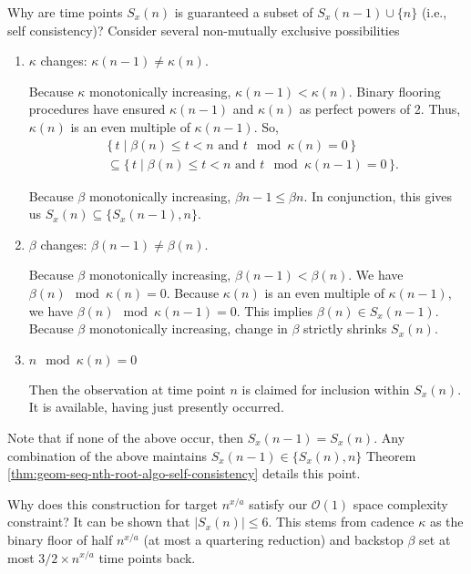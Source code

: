 Why are time points $S_x(n)$ is guaranteed a subset of $S_x(n-1) \cup \{n\}$ (i.e., self consistency)?
Consider several non-mutually exclusive possibilities
\begin{enumerate}
  \item $\kappa$ changes: $\kappa(n - 1) \neq \kappa(n)$.

  Because $\kappa$ monotonically increasing, $\kappa(n - 1) < \kappa(n)$.
  Binary flooring procedures have ensured $\kappa(n - 1)$ and $\kappa(n)$ as perfect powers of 2.
  Thus, $\kappa(n)$ is an even multiple of $\kappa(n - 1)$.
  So,
  \begin{align*}
    &\{\, t \mid \beta(n) \leq t < n \text{ and } t \mod \kappa(n) = 0 \,\}\\
    &\subseteq \{\, t \mid \beta(n) \leq t < n \text{ and } t \mod \kappa(n - 1) = 0 \,\}.
  \end{align*}

  Because $\beta$ monotonically increasing, $\beta{n - 1} \leq \beta{n}$.
  In conjunction, this gives us $S_x(n) \subseteq \{S_x(n - 1), n\}$.

  \item $\beta$ changes: $\beta(n - 1) \neq \beta(n)$.

  Because $\beta$ monotonically increasing, $\beta(n - 1) < \beta(n)$.
  We have $\beta(n) \mod \kappa(n) = 0$.
  Because $\kappa(n)$ is an even multiple of $\kappa(n - 1)$, we have $\beta(n) \mod \kappa(n - 1) = 0$.
  This implies $\beta(n) \in S_x(n - 1)$.
  Because $\beta$ monotonically increasing, change in $\beta$ strictly shrinks $S_x(n)$.

  \item $n \mod \kappa(n) = 0$

  Then the observation at time point $n$ is claimed for inclusion within $S_x(n)$.
  It is available, having just presently occurred.

\end{enumerate}

Note that if none of the above occur, then $S_x(n - 1) = S_x(n)$.
Any combination of the above maintains $S_x(n - 1) \in \{S_x(n), n\}$
Theorem \ref{thm:geom-seq-nth-root-algo-self-consistency} details this point.


Why does this construction for target $n^{x/a}$ satisfy our $\mathcal{O}(1)$ space complexity constraint?
It can be shown that $|S_x(n)| \leq 6$.
This stems from cadence $\kappa$ as the binary floor of half $n^{x/a}$ (at most a quartering reduction) and backstop $\beta$ set at most $3/2 \times n^{x/a}$ time points back.

